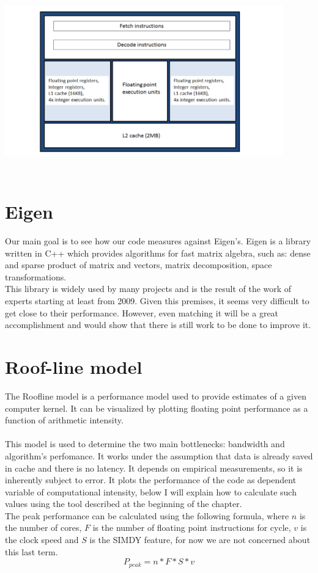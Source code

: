 \documentclass[11pt,a4paper,oneside,titlepage,openright]{book}
\begin{document}
\begin{center}
\includegraphics[width=12cm, height=8cm]{interlagos}
\end{center}

\section{Eigen}
Our main goal is to see how our code measures against Eigen's. 
Eigen is a library written in C++ which provides algorithms for fast matrix algebra, such as: dense and sparse product of matrix and vectors, matrix decomposition, space transformations. \\This library is widely used by many projects and is the result of the work of experts starting at least from 2009. Given this premises, it seems very difficult to get close to their performance. However, even matching it will be a great accomplishment and would show that there is still work to be done to improve it. 

\section{Roof-line model}
The Roofline model is a performance model used to provide estimates of a given computer kernel. 
It can be visualized by plotting floating point performance as a function of arithmetic intensity. \\\\
This model is used to determine the two main bottlenecks: bandwidth and algorithm's perfomance. It works under the assumption that data is already saved in cache and there  is no latency. It depends on empirical measurements, so it is inherently subject to error. 
It plots the performance of the code as dependent variable of computational intensity, below I will explain how to calculate such values using the tool described at the beginning of the chapter. 
\\
The peak performance can be calculated using the following formula, where $n$ is the number of cores, $F$ is the number of floating point instructions for cycle, $v$ is the clock speed and $S$ is the SIMDY feature, for now we are not concerned about this last term. 
$$ P_{peak} = n * F * S * v $$ 
\end{document}
